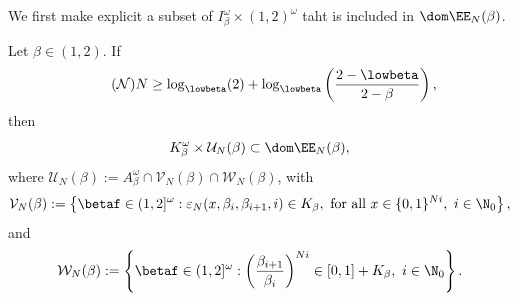 We first make explicit a subset of $I_\beta^\omega \times (1, 2)^\omega$ taht is included in $\dom \EE_N(\beta)$.
\begin{lemma}\label{eq:J beta is in dom E beta N beta r}
	Let $\beta \in (1,2)$. If 
	\begin{equation}\label{eq:condition on N}
		\tag{$\mathcal N$}
		N \geq \log_{\lowbeta}(2) + \log_{\lowbeta}\left( \frac{2- {\lowbeta}}{2 - \beta} \right),
	\end{equation}
	then
	\begin{equation}
		K_\beta^\omega \times \mathcal U_N(\beta) \subset \dom \EE_N(\beta),
	\end{equation}
	where $\mathcal U_N(\beta) := A_\beta^\omega \cap \mathcal V_N(\beta) \cap \mathcal W_N(\beta)$, with
	\begin{equation}\label{eq:definition V beta N}
		\mathcal V_N(\beta) := \left\{ \betaf \in (1,2]^\omega : \varepsilon_N(x, \beta_i, \beta_{i+1} , i) \in K_{\beta}, \ \text{for all} \ x \in \{0,1\}^{Ni}, \ i \in \N_0 \right\},
	\end{equation}
	and
	\begin{equation}\label{eq:definition W beta N}
		\mathcal W_N(\beta) := \left\{ \betaf \in (1,2]^\omega : \left(\frac{\beta_{i+1}}{\beta_{i}}\right)^{Ni} \in [0,1] + K_{\beta}, \ i \in \N_0 \right\}.
	\end{equation}
\end{lemma}
